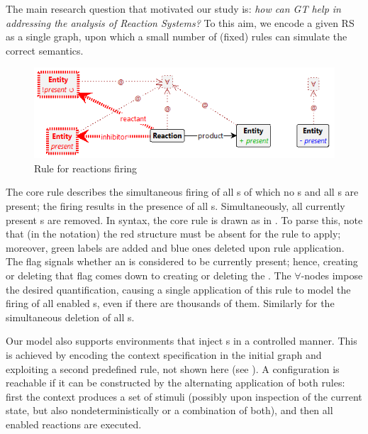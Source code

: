 The main research question that motivated our study is: 
\emph{how can GT help in addressing the analysis of Reaction Systems?} 
To this aim, we encode a given RS as a single graph, upon which a small number of (fixed) rules can simulate the correct semantics. 

\begin{figure}
\centering
\includegraphics[scale=.42]{react}
\caption{Rule for reactions firing}
\label{fig:reactionfiring}
\end{figure}

The core rule describes the simultaneous firing of all s of which no s and all s are present; the firing results in the presence of all s. Simultaneously, all currently present s are removed. In \GROOVE syntax, the core rule is drawn as in .
To parse this, note that (in the \GROOVE notation) the red structure must be absent for the rule to apply; moreover, green labels are added and blue ones deleted upon rule application. The  flag signals whether an  is considered to be currently present; hence, creating or deleting that flag comes down to creating or deleting the . The $\forall$-nodes impose the desired quantification, causing a single application of this rule to model the firing of all enabled s, even if there are thousands of them.
Similarly for the simultaneous deletion of all s.

Our model also supports environments that inject s in a controlled manner. This is achieved by encoding the context specification in the initial graph and exploiting a second predefined rule, not shown here (see ). A configuration is reachable if it can be constructed by the alternating application of both rules: first the context produces a set of stimuli (possibly upon inspection of the current state, but also nondeterministically or a combination of both), and then all enabled reactions are executed.


